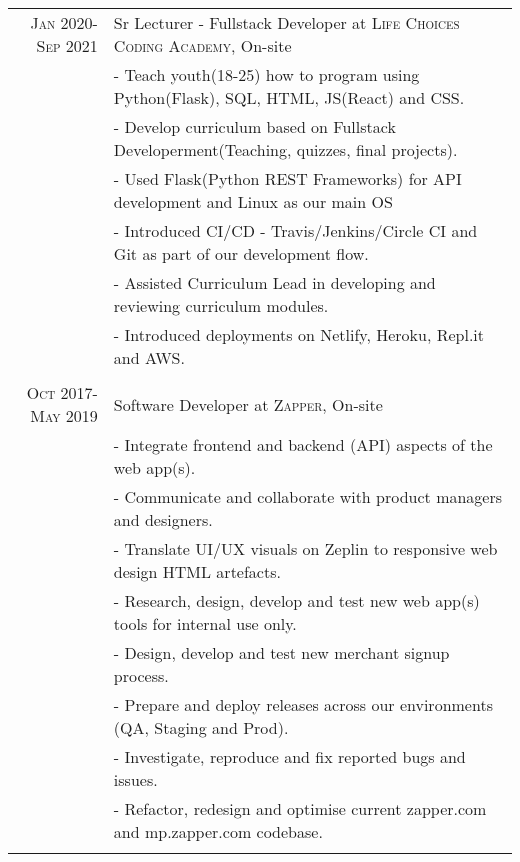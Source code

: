 \documentclass[a4paper,10pt]{article} %
\begin{document}
\begin{tabular}{r|p{15cm}}

\textsc{Jan 2020-Sep 2021} & Sr Lecturer - Fullstack Developer at \textsc{Life Choices Coding Academy}, On-site \emph{}\\
& \footnotesize{- Teach youth(18-25) how to program using  Python(Flask), SQL, HTML, JS(React) and CSS.}\\
& \footnotesize{- Develop curriculum based on Fullstack Developerment(Teaching, quizzes, final projects).}\\
& \footnotesize{- Used Flask(Python REST Frameworks) for API development and Linux as our main OS}\\
& \footnotesize{- Introduced CI/CD - Travis/Jenkins/Circle CI and Git as part of our development flow.}\\
& \footnotesize{- Assisted Curriculum Lead in developing and reviewing curriculum modules.}\\
& \footnotesize{- Introduced deployments on Netlify, Heroku, Repl.it and AWS.}\\
\multicolumn{2}{c}{} \\


\textsc{Oct 2017-May 2019} & Software Developer at \textsc{Zapper}, On-site \emph{}\\
& \footnotesize{- Integrate frontend and backend (API) aspects of the web app(s).}\\
& \footnotesize{- Communicate and collaborate with product managers and designers.}\\
& \footnotesize{- Translate UI/UX visuals on Zeplin to responsive web design HTML artefacts.}\\
& \footnotesize{- Research, design, develop and test new web app(s) tools for internal use only.}\\
& \footnotesize{- Design, develop and test new merchant signup process.}\\
& \footnotesize{- Prepare and deploy releases across our environments (QA, Staging and Prod).}\\
& \footnotesize{- Investigate, reproduce and fix reported bugs and issues.}\\
& \footnotesize{- Refactor, redesign and optimise current zapper.com and mp.zapper.com codebase.}\\
\multicolumn{2}{c}{} \\


\end{tabular}
\end{document}
